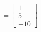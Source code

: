 \documentclass[preview]{standalone}
\begin{document}
\begin{align*}
=\begin{bmatrix} 1 \\ 5 \\ -10 \end{bmatrix}
\end{align*}
\end{document}
